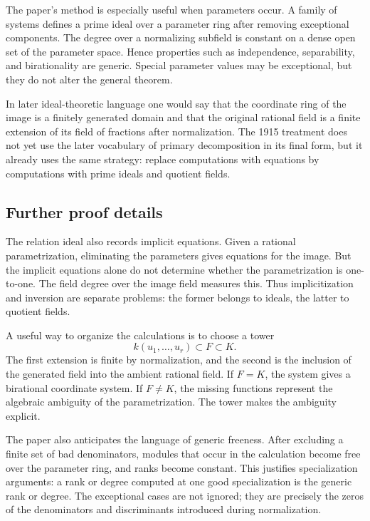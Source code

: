 \documentclass[12pt]{article}
\begin{document}
The paper's method is especially useful when parameters occur. A family of systems defines a prime
ideal over a parameter ring after removing exceptional components. The degree over a normalizing
subfield is constant on a dense open set of the parameter space. Hence properties such as
independence, separability, and birationality are generic. Special parameter values may be
exceptional, but they do not alter the general theorem.

In later ideal-theoretic language one would say that the coordinate ring of the image is a finitely
generated domain and that the original rational field is a finite extension of its field of
fractions after normalization. The 1915 treatment does not yet use the later vocabulary of primary
decomposition in its final form, but it already uses the same strategy: replace computations with
equations by computations with prime ideals and quotient fields.


\subsection{Further proof details}

The relation ideal also records implicit equations. Given a rational parametrization, eliminating
the parameters gives equations for the image. But the implicit equations alone do not determine
whether the parametrization is one-to-one. The field degree over the image field measures this. Thus
implicitization and inversion are separate problems: the former belongs to ideals, the latter to
quotient fields.

A useful way to organize the calculations is to choose a tower \[   k(u_1, \ldots,u_r)\subset
F\subset K. \] The first extension is finite by normalization, and the second is the inclusion of
the generated field into the ambient rational field. If \(F=K\), the system gives a birational
coordinate system. If \(F\neq K\), the missing functions represent the algebraic ambiguity of the
parametrization. The tower makes the ambiguity explicit.

The paper also anticipates the language of generic freeness. After excluding a finite set of bad
denominators, modules that occur in the calculation become free over the parameter ring, and ranks
become constant. This justifies specialization arguments: a rank or degree computed at one good
specialization is the generic rank or degree. The exceptional cases are not ignored; they are
precisely the zeros of the denominators and discriminants introduced during normalization.
\end{document}
